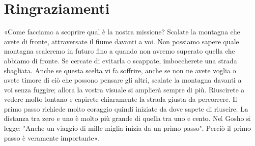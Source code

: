 \chapter{Ringraziamenti}

«Come facciamo a scoprire qual è la nostra missione?
Scalate la montagna che avete di fronte, attraversate il fiume davanti a voi.
Non possiamo sapere quale montagna scaleremo in futuro fino a quando non avremo superato quella che abbiamo di fronte.
Se cercate di evitarla o scappate,
imboccherete una strada sbagliata.
Anche se questa	scelta vi fa soffrire, anche se non ne avete voglia o avete timore di ciò che possono pensare gli altri, scalate la montagna davanti a voi senza fuggire;
allora la vostra visuale si amplierà sempre di più.
Riuscirete a vedere molto lontano e capirete chiaramente la strada giusta da percorrere.
Il primo passo richiede molto coraggio quindi iniziate da dove sapete di riuscire.
La distanza tra zero e uno è molto più grande di quella tra uno e cento.
Nel Gosho si legge: "Anche un viaggio di mille miglia inizia da un primo passo".
Perciò il primo passo è veramente importante».
